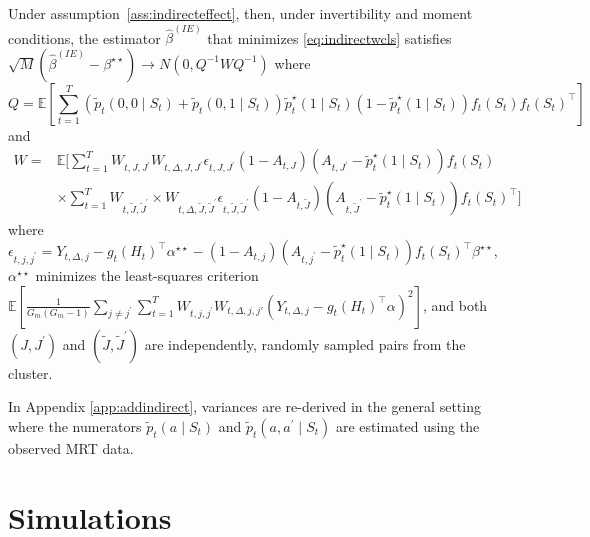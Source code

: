 \documentclass[lineno]{biometrika}
\begin{document}
\begin{lemma}
\label{lemma:asymnorm2}
Under assumption~\ref{ass:indirecteffect}, then, under invertibility and moment conditions, the estimator $\hat \beta^{(IE)}$ that minimizes \eqref{eq:indirectwcls} satisfies $\sqrt{M} \left( \hat \beta^{(IE)} - \beta^{\star \star} \right) \to N(0, Q^{-1} W Q^{-1})$ where
$$
Q = \mathbb{E} \left[ \sum_{t=1}^T (\tilde p_t (0,0 \mid S_t) + \tilde p_t (0,1 \mid S_t)) \tilde p_t^\star ( 1 \mid S_{t} ) ( 1- \tilde p_t^\star ( 1 \mid S_{t} )) f_t (S_t) f_t (S_t)^\top \right]
$$
and
\begin{align*}
W =  &\mathbb{E} \bigg[ \sum_{t=1}^T W_{t,J,J^\prime} W_{t,\Delta, J,J^\prime} \epsilon_{t,J,J^\prime} (1-A_{t,J})( A_{t,J^\prime} - \tilde p_t^\star( 1 \mid S_{t} )) f_t (S_t) \\
&\times \sum_{t=1}^T W_{t,\tilde J,\tilde J^\prime} \times W_{t, \Delta, \tilde J, \tilde J^\prime} \epsilon_{t, \tilde J, \tilde J^\prime} (1-A_{t,\tilde J}) ( A_{t,\tilde J^\prime} - \tilde p_t^\star( 1 \mid S_{t} )) f_t (S_t)^\top  \bigg]
\end{align*}
where $\epsilon_{t,j,j^\prime} = Y_{t,\Delta,j} - g_t(H_t)^\top \alpha^{\star \star} - (1-A_{t,j}) (A_{t,j^\prime} - \tilde p_t^\star (1 \mid S_t) ) f_t (S_t)^\top \beta^{\star \star}$,$\alpha^{\star \star}$ minimizes the least-squares criterion $\mathbb{E}  \left[ \frac{1}{G_m (G_m-1)} \sum_{j \neq j^\prime} \sum_{t=1}^T W_{t,j,j^\prime} W_{t,\Delta, j,j'} \left( Y_{t,\Delta,j} - g_t(H_t)^\top \alpha \right)^2 \right]$, and both $(J,J^\prime)$ and $(\tilde J, \tilde J^\prime)$ are independently, randomly sampled pairs from the cluster.
\end{lemma}

\begin{remark}%
In Appendix \ref{app:addindirect}, variances are re-derived in the general setting where the numerators $\tilde p_t (a \mid S_t)$ and $\tilde p_t (a, a^\prime \mid S_t)$ are estimated using the observed MRT data.  
\end{remark}



\section{Simulations}
\label{section:sims}
\end{document}
